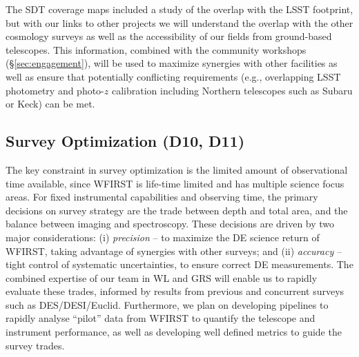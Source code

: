 {The SDT coverage maps included a study of the overlap with the LSST footprint,
but with our links to other projects we will understand the overlap with
the other cosmology surveys as well as the accessibility
of our fields from ground-based telescopes. This information, combined with the
community workshops (\S\ref{sec:engagement}), will be used to maximize synergies with
other facilities as well as ensure that potentially conflicting requirements (e.g.,
overlapping LSST photometry and photo-$z$ calibration including Northern telescopes
such as Subaru or Keck) can be met.



\subsection{Survey Optimization (D10, D11)}
\label{sec:sur_opt}

The key constraint in survey optimization is the limited amount of observational time
available, since WFIRST is life-time limited and has multiple science focus areas.
For fixed instrumental capabilities and observing time, the primary
decisions on survey strategy are the trade between depth and total area, and
the balance between imaging and spectroscopy. 
These decisions are driven by two major considerations: 
(i) {\em precision} -- to maximize the DE science return of WFIRST, taking advantage of synergies with other surveys; and
(ii) {\em accuracy} -- tight control of systematic uncertainties, to ensure correct DE measurements.
The combined expertise of our team in WL and GRS will enable us to rapidly evaluate
these trades, informed by results from previous and concurrent surveys such as 
DES/DESI/Euclid. Furthermore, we plan on developing pipelines to
rapidly analyse ``pilot'' data from WFIRST to quantify the telescope
and instrument performance, as well as developing well defined metrics to guide the survey trades.

}
